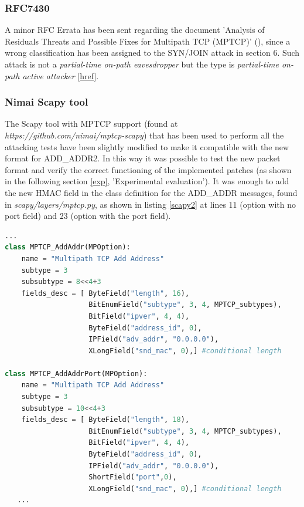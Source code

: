 \subsubsection{RFC7430}
A minor RFC Errata has been sent regarding the document 'Analysis of Residuals Threats and Possible Fixes for Multipath TCP (MPTCP)' (), since a wrong classification has been assigned to the SYN/JOIN attack in section 6. Such attack is not a \textit{partial-time on-path eavesdropper} but the type is \textit{partial-time on-path active attacker} [\href{http://www.rfc-editor.org/errata_search.php?rfc=7430&eid=4565}{href}].

\subsubsection{Nimai Scapy tool}
The Scapy tool with MPTCP support (found at \textit{https://github.com/nimai/mptcp-scapy}) that has been used to perform all the attacking tests have been slightly modified to make it compatible with the new format for ADD\_ADDR2. In this way it was possible to test the new packet format and verify the correct functioning of the implemented patches (as shown in the following section \ref{exp}, 'Experimental evaluation'). It was enough to add the new HMAC field in the class definition for the ADD\_ADDR messages, found in \textit{scapy/layers/mptcp.py}, as shown in listing \ref{scapy2} at lines 11 (option with no port field) and 23 (option with the port field).

\begin{lstlisting}[language=Python, caption=\textit{Scapy ADD\_ADDR2 class definition}, label=scapy2]
   ...
class MPTCP_AddAddr(MPOption):
    name = "Multipath TCP Add Address"
    subtype = 3
    subsubtype = 8<<4+3
    fields_desc = [ ByteField("length", 16),
                    BitEnumField("subtype", 3, 4, MPTCP_subtypes),
                    BitField("ipver", 4, 4),
                    ByteField("address_id", 0),
                    IPField("adv_addr", "0.0.0.0"),
                    XLongField("snd_mac", 0),] #conditional length

class MPTCP_AddAddrPort(MPOption):
    name = "Multipath TCP Add Address"
    subtype = 3
    subsubtype = 10<<4+3
    fields_desc = [ ByteField("length", 18),
                    BitEnumField("subtype", 3, 4, MPTCP_subtypes),
                    BitField("ipver", 4, 4),
                    ByteField("address_id", 0),
                    IPField("adv_addr", "0.0.0.0"),
                    ShortField("port",0),
                    XLongField("snd_mac", 0),] #conditional length
   ...
\end{lstlisting}

